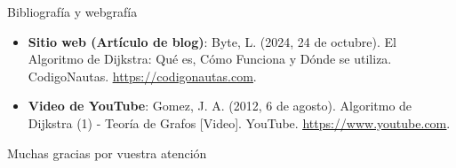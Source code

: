 \documentclass{beamer}
\begin{document}
    \begin{frame}{Bibliografía y webgrafía}
        \begin{itemize}
            \item \textbf{Sitio web (Artículo de blog)}: Byte, L. (2024, 24 de octubre). El Algoritmo de Dijkstra: Qué es, Cómo Funciona y Dónde se utiliza. CodigoNautas. \color{blue}\underline{\href{https://codigonautas.com/algoritmo-dijkstra-que-es-ejemplo/}{https://codigonautas.com}}\color{black}.

            \item \textbf{Video de YouTube}: Gomez, J. A. (2012, 6 de agosto). Algoritmo de Dijkstra (1) - Teoría de Grafos [Video]. YouTube. \color{blue}\underline{\href{https://www.youtube.com/watch?v=fgdCNuGPJnw}{https://www.youtube.com}}\color{black}.
        \end{itemize}
    \end{frame}

    \begin{frame}
        \begin{center}
            \LARGE Muchas gracias por vuestra atención
            
            \normalsize
        \end{center}
    \end{frame}
\end{document}
